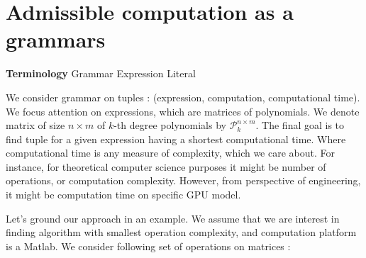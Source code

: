 \documentclass{article}
\begin{document}


\section{Admissible computation as a grammars}\label{sec:grammars}

{\bf Terminology}
Grammar
Expression
Literal



We consider grammar on tuples : (expression, computation, computational time).
We focus attention on expressions, which are matrices of polynomials. We denote
matrix of size $n \times m$ of $k$-th degree polynomials by $\mathcal{P}^{n
\times m}_k$.  The final goal is to find tuple for a given expression having
a shortest computational time. Where computational time is any measure of
complexity, which we care about. For instance, for theoretical computer science
purposes it might be number of operations, or computation complexity. However,
from perspective of engineering, it might be computation time on specific GPU
model. 


Let's ground our approach in an example. We assume that we are interest in
finding algorithm with smallest operation complexity, and computation platform
is a Matlab.  We consider following set of operations on matrices : 
\end{document}
